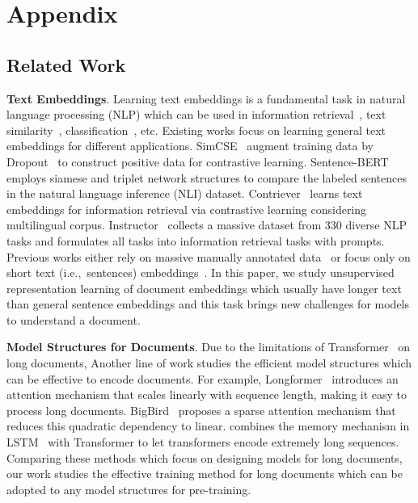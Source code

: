 \documentclass[11pt]{article}
\begin{document}



\clearpage
\appendix
\section{Appendix}

\subsection{Related Work}

\textbf{Text Embeddings}. Learning text embeddings is a fundamental task in natural language processing (NLP) which can be used in information retrieval~\cite{Thakur2021BEIRAH}, text similarity~\cite{Gao2021SimCSESC}, classification~\cite{Minaee2021DeepLB}, etc. Existing works focus on learning general text embeddings for different applications. SimCSE~\cite{Gao2021SimCSESC} augment training data by Dropout~\cite{Srivastava2014DropoutAS} to construct positive data for contrastive learning. Sentence-BERT~\cite{Reimers2019SentenceBERTSE} employs siamese and triplet network structures to compare the labeled sentences in the natural language inference (NLI) dataset. Contriever~\cite{Izacard2021UnsupervisedDI} learns text embeddings for information retrieval via contrastive learning considering multilingual corpus. Instructor~\cite{Su2022OneEA} collects a massive dataset from 330 diverse NLP tasks and formulates all tasks into information retrieval tasks with prompts. 
Previous works either rely on massive manually annotated data~\cite{Su2022OneEA, Reimers2019SentenceBERTSE} or focus only on short text (i.e.,~sentences) embeddings~\cite{Gao2021SimCSESC}.
In this paper, we study unsupervised representation learning of document embeddings which usually have longer text than general sentence embeddings and this task brings new challenges for models to understand a document.

\textbf{Model Structures for Documents}. Due to the limitations of Transformer~\cite{Vaswani2017AttentionIA} on long documents, Another line of work studies the efficient model structures which can be effective to encode documents. For example, Longformer~\cite{Beltagy2020LongformerTL} introduces an attention mechanism that scales linearly with sequence length, making it easy to process long documents. BigBird~\cite{Zaheer2020BigBT} proposes a sparse attention mechanism that reduces this quadratic dependency to linear. \citet{Bulatov2022RecurrentMT} combines the memory mechanism in LSTM~\cite{Hochreiter1997LongSM} with Transformer to let transformers encode extremely long sequences. Comparing these methods which focus on designing models for long documents, our work studies the effective training method for long documents which can be adopted to any model structures for pre-training.
\end{document}
